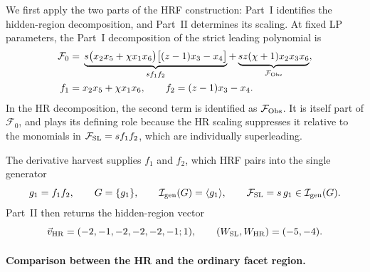 \documentclass[a4paper,11pt]{article}
\newcommand{\FSL}{\mathcal F_{\rm SL}}
\newcommand{\FObs}{\mathcal F_{\rm Obs}}
\newcommand{\WSL}{W_{\rm SL}}
\newcommand{\WHR}{W_{\rm HR}}
\newcommand{\vHR}{\vec v_{\rm HR}}
\begin{document}
We first apply the two parts of the HRF construction: Part~I identifies the
hidden-region decomposition, and Part~II determines its scaling.  At fixed LP
parameters, the Part~I decomposition of the strict leading polynomial is
\begin{equation}
 \begin{aligned}
 \mathcal F_0={}&
 \underbrace{s\bigl(x_2x_5+\chi x_1x_6\bigr)
       \bigl[(z-1)x_3-x_4\bigr]}_{s f_1f_2}
 +\underbrace{sz(\chi+1)x_2x_3x_6}_{\FObs},\\
 f_1={}&x_2x_5+\chi x_1x_6,
 \qquad f_2=(z-1)x_3-x_4.
 \end{aligned}
 \label{eq:five-F0-obstruction}
\end{equation}
In the HR decomposition, the second term is identified as \(\FObs\).  It is
itself part of \(\mathcal F_0\), and plays its defining role because the HR
scaling suppresses it relative to the monomials in ${\cal F}_{\text{SL}}=s f_1f_2$, which are individually superleading.

The derivative harvest supplies \(f_1\) and \(f_2\), which HRF pairs into the
single generator
\begin{equation}
 g_1=f_1f_2,
 \qquad G=\{g_1\},
 \qquad \mathcal I_{\rm gen}(G)=\langle g_1\rangle,
 \qquad \FSL=s\,g_1\in\mathcal I_{\rm gen}(G).
 \label{eq:five-generator}
\end{equation}
Part~II then returns the hidden-region vector
\begin{equation}
 \vHR=(-2,-1,-2,-2,-2,-1;1),
 \qquad (\WSL,\WHR)=(-5,-4).
 \label{eq:five-HR-vector}
\end{equation}
\paragraph{Comparison between the HR and the ordinary facet region.}
\end{document}
